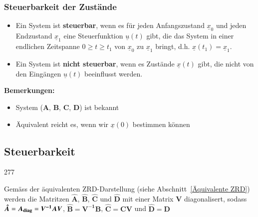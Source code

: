 \subsubsection*{Steuerbarkeit der Zustände}

\begin{itemize}
    \item Ein System ist \textbf{steuerbar}, wenn es für jeden Anfangszustand $\underline{x}_0$ und jeden Endzustand $\underline{x}_1$
        eine Steuerfunktion $\underline{u}(t)$ gibt, die das System in einer endlichen Zeitspanne $0 \geq t \geq t_1$ von
        $\underline{x}_0$ zu $\underline{x}_1$ bringt, d.h. $\underline{x}(t_1) = \underline{x}_1$. 
    \item Ein System ist \textbf{nicht steuerbar}, wenn es Zustände $\underline{x}(t)$ gibt, die nicht von den 
        Eingängen $\underline{u}(t)$ beeinflusst werden. 
\end{itemize}

\vspace{0.2cm}
\textbf{Bemerkungen: }
\begin{itemize}
    \item System ($\bm{A}$, $\bm{B}$, $\bm{C}$, $\bm{D}$) ist bekannt 
    \item Äquivalent reicht es, wenn wir $\underline{x}(0)$ bestimmen können
\end{itemize}
    

\subsection{Steuerbarkeit}{277}

Gemäss der äquivalenten ZRD-Darstellung (siehe Abschnitt~\ref{Äquivalente ZRD}) werden die Matritzen $\bm{\hat{A}}$,
$\bm{\hat{B}}$, $\bm{\hat{C}}$ und $\bm{\hat{D}}$ mit einer Matrix $\bm{V}$ diagonalisert, sodass 
$\bm{\hat{A}} = \bm{A_{\rm diag}} = \bm{V^{-1} A V}$, $\bm{\hat{B}} = \bm{V^{-1} B}$, 
$\bm{\hat{C}} = \bm{C V}$ und $\bm{\hat{D}} = \bm{D}$

\vspace{0.2cm}

\vspace{0.2cm}

